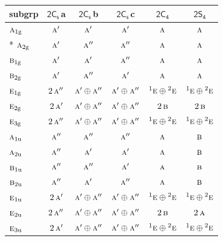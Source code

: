 \documentclass[10pt,a4paper]{article}
\numberwithin{equation}{section}
\newcommand{\grp}[1]{\mathsf{#1}}
\newcommand{\irr}[1]{\text{\normalfont\scshape #1}}
\newcommand{\conjpair}[1]{{}^{#1}}
\newcommand{\ptag}[1]{\mathrm{#1}}
\newcommand{\clsletter}[1]{\,{\scriptsize\color{black!55}#1}}
\begin{document}
{\small\begin{longtable}{@{}lccccc@{}}\toprule
subgrp & \href{2C1v.pdf}{$\grp{2C_{s}}$}\clsletter{a} & \href{2C1v.pdf}{$\grp{2C_{s}}$}\clsletter{b} & \href{2C1v.pdf}{$\grp{2C_{s}}$}\clsletter{c} & \href{2C4.pdf}{$\grp{2C_{4}}$} & \href{2S4.pdf}{$\grp{2S_{4}}$}\\\midrule\endhead
\bottomrule\endfoot\endlastfoot
$\irr{a}_{1\ptag{g}}$ & $\irr{a}'$ & $\irr{a}'$ & $\irr{a}'$ & $\irr{a}$ & $\irr{a}$\\*
$\irr{a}_{2\ptag{g}}$ & $\irr{a}'$ & $\irr{a}''$ & $\irr{a}''$ & $\irr{a}$ & $\irr{a}$\\
$\irr{b}_{1\ptag{g}}$ & $\irr{a}'$ & $\irr{a}'$ & $\irr{a}''$ & $\irr{a}$ & $\irr{a}$\\
$\irr{b}_{2\ptag{g}}$ & $\irr{a}'$ & $\irr{a}''$ & $\irr{a}'$ & $\irr{a}$ & $\irr{a}$\\
$\irr{e}_{1\ptag{g}}$ & $2\,\irr{a}''$ & $\irr{a}'\oplus \irr{a}''$ & $\irr{a}'\oplus \irr{a}''$ & $\conjpair{1}\irr{e}\oplus \conjpair{2}\irr{e}$ & $\conjpair{1}\irr{e}\oplus \conjpair{2}\irr{e}$\\
$\irr{e}_{2\ptag{g}}$ & $2\,\irr{a}'$ & $\irr{a}'\oplus \irr{a}''$ & $\irr{a}'\oplus \irr{a}''$ & $2\,\irr{b}$ & $2\,\irr{b}$\\
$\irr{e}_{3\ptag{g}}$ & $2\,\irr{a}''$ & $\irr{a}'\oplus \irr{a}''$ & $\irr{a}'\oplus \irr{a}''$ & $\conjpair{1}\irr{e}\oplus \conjpair{2}\irr{e}$ & $\conjpair{1}\irr{e}\oplus \conjpair{2}\irr{e}$\\
$\irr{a}_{1\ptag{u}}$ & $\irr{a}''$ & $\irr{a}''$ & $\irr{a}''$ & $\irr{a}$ & $\irr{b}$\\
$\irr{a}_{2\ptag{u}}$ & $\irr{a}''$ & $\irr{a}'$ & $\irr{a}'$ & $\irr{a}$ & $\irr{b}$\\
$\irr{b}_{1\ptag{u}}$ & $\irr{a}''$ & $\irr{a}''$ & $\irr{a}'$ & $\irr{a}$ & $\irr{b}$\\
$\irr{b}_{2\ptag{u}}$ & $\irr{a}''$ & $\irr{a}'$ & $\irr{a}''$ & $\irr{a}$ & $\irr{b}$\\
$\irr{e}_{1\ptag{u}}$ & $2\,\irr{a}'$ & $\irr{a}'\oplus \irr{a}''$ & $\irr{a}'\oplus \irr{a}''$ & $\conjpair{1}\irr{e}\oplus \conjpair{2}\irr{e}$ & $\conjpair{1}\irr{e}\oplus \conjpair{2}\irr{e}$\\
$\irr{e}_{2\ptag{u}}$ & $2\,\irr{a}''$ & $\irr{a}'\oplus \irr{a}''$ & $\irr{a}'\oplus \irr{a}''$ & $2\,\irr{b}$ & $2\,\irr{a}$\\
$\irr{e}_{3\ptag{u}}$ & $2\,\irr{a}'$ & $\irr{a}'\oplus \irr{a}''$ & $\irr{a}'\oplus \irr{a}''$ & $\conjpair{1}\irr{e}\oplus \conjpair{2}\irr{e}$ & $\conjpair{1}\irr{e}\oplus \conjpair{2}\irr{e}$\\

\end{longtable}}
\end{document}
